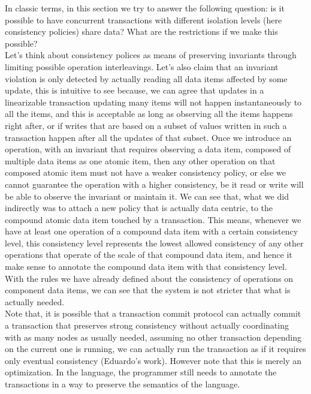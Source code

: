 In classic terms, in this section we try to answer the following question: is it
possible to have concurrent transactions with different isolation levels (here
consistency policies) share data? What are the restrictions if we make this
possible? \\

Let's think about consistency polices as means of preserving invariants through 
limiting possible operation interleavings. Let's also claim that an invariant violation 
is only detected by actually reading all data items affected by some update, this is 
intuitive to see because, we can agree that updates in a linearizable transaction 
updating many items will not happen instantaneously to all the items, and this is 
acceptable as long as observing all the items happens right after, or if writes that 
are based on a subset of values written in such a transaction happen after all the
updates of that subset. Once we introduce an operation, with an invariant that requires 
observing a data item, composed of multiple data items as one atomic item, then any other 
operation on that composed atomic item must not have a weaker consistency policy, or else 
we cannot guarantee the operation with a higher consistency, be it read or write will be
able to observe the invariant or maintain it. We can see that, what we did indirectly was 
to attach a new policy that is actually data centric, to the compound atomic data item 
touched by a transaction. This means, whenever we have at least one operation of a 
compound data item with a certain consistency level, this consistency level represents 
the lowest allowed consistency of any other operations that operate of the scale of that 
compound data item, and hence it make sense to annotate the compound data item with that
consistency level. With the rules we have already defined about the consistency of 
operations on component data items, we can see that the system is not stricter that what 
is actually needed. \\

Note that, it is possible that a transaction commit protocol can actually commit
a transaction that preserves strong consistency without actually coordinating
with as many nodes as usually needed, assuming no other transaction depending on
the current one is running, we can actually run the transaction as if it
requires only eventual consistency (Eduardo's work). However note that this is
merely an optimization. In the language, the programmer still needs to annotate
the transactions in a way to preserve the semantics of the language. \\

